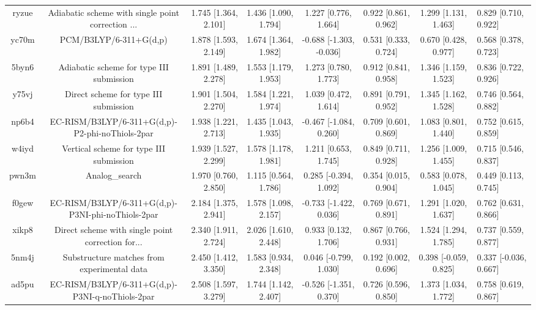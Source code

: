 \documentclass{article}
\begin{document}
\begin{center}
\begin{longtable}{|ccccccc|}
 ryzue &  Adiabatic scheme with single point correction ... &  1.745 [1.364, 2.101] &  1.436 [1.090, 1.794] &     1.227 [0.776, 1.664] &  0.922 [0.861, 0.962] &   1.299 [1.131, 1.463] &   0.829 [0.710, 0.922] \\
 yc70m &                             PCM/B3LYP/6-311+G(d,p) &  1.878 [1.593, 2.149] &  1.674 [1.364, 1.982] &  -0.688 [-1.303, -0.036] &  0.531 [0.333, 0.724] &   0.670 [0.428, 0.977] &   0.568 [0.378, 0.723] \\
 5byn6 &           Adiabatic scheme for type III submission &  1.891 [1.489, 2.278] &  1.553 [1.179, 1.953] &     1.273 [0.780, 1.773] &  0.912 [0.841, 0.958] &   1.346 [1.159, 1.523] &   0.836 [0.722, 0.926] \\
 y75vj &              Direct scheme for type III submission &  1.901 [1.504, 2.270] &  1.584 [1.221, 1.974] &     1.039 [0.472, 1.614] &  0.891 [0.791, 0.952] &   1.345 [1.162, 1.528] &   0.746 [0.564, 0.882] \\
 np6b4 &    EC-RISM/B3LYP/6-311+G(d,p)-P2-phi-noThiols-2par &  1.938 [1.221, 2.713] &  1.435 [1.043, 1.935] &   -0.467 [-1.084, 0.260] &  0.709 [0.601, 0.869] &   1.083 [0.801, 1.440] &   0.752 [0.615, 0.859] \\
 w4iyd &            Vertical scheme for type III submission &  1.939 [1.527, 2.299] &  1.578 [1.178, 1.981] &     1.211 [0.653, 1.745] &  0.849 [0.711, 0.928] &   1.256 [1.009, 1.455] &   0.715 [0.546, 0.837] \\
 pwn3m &                                     Analog\_search &  1.970 [0.760, 2.850] &  1.115 [0.564, 1.786] &    0.285 [-0.394, 1.092] &  0.354 [0.015, 0.904] &   0.583 [0.078, 1.045] &   0.449 [0.113, 0.745] \\
 f0gew &  EC-RISM/B3LYP/6-311+G(d,p)-P3NI-phi-noThiols-2par &  2.184 [1.375, 2.941] &  1.578 [1.098, 2.157] &   -0.733 [-1.422, 0.036] &  0.769 [0.671, 0.891] &   1.291 [1.020, 1.637] &   0.762 [0.631, 0.866] \\
 xikp8 &  Direct scheme with single point correction for... &  2.340 [1.911, 2.724] &  2.026 [1.610, 2.448] &     0.933 [0.132, 1.706] &  0.867 [0.766, 0.931] &   1.524 [1.294, 1.785] &   0.737 [0.559, 0.877] \\
 5nm4j &        Substructure matches from experimental data &  2.450 [1.412, 3.350] &  1.583 [0.934, 2.348] &    0.046 [-0.799, 1.030] &  0.192 [0.002, 0.696] &  0.398 [-0.059, 0.825] &  0.337 [-0.036, 0.667] \\
 ad5pu &    EC-RISM/B3LYP/6-311+G(d,p)-P3NI-q-noThiols-2par &  2.508 [1.597, 3.279] &  1.744 [1.142, 2.407] &   -0.526 [-1.351, 0.370] &  0.726 [0.596, 0.850] &   1.373 [1.034, 1.772] &   0.758 [0.619, 0.867] \\

\end{longtable}
\end{center}
\end{document}
